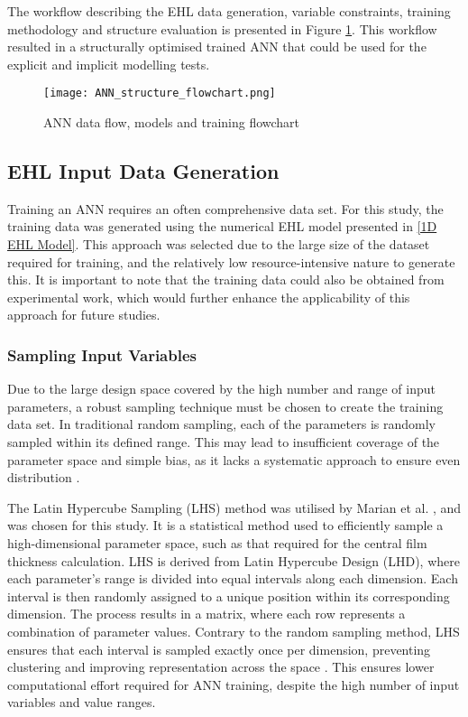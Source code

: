 The workflow describing the EHL data generation, variable constraints, training methodology and structure evaluation is presented in Figure \ref{ANN flowchart}. This workflow resulted in a structurally optimised trained ANN that could be used for the explicit and implicit modelling tests.

\begin{figure}  
	\centering
	\texttt{[image: ANN\_structure\_flowchart.png]}
	\caption{ANN data flow, models and training flowchart}
	\label{ANN flowchart}
\end{figure} 

\subsection{EHL Input Data Generation}

Training an ANN requires an often comprehensive data set. For this study, the training data was generated using the numerical EHL model presented in \ref{1D EHL Model}. This approach was selected due to the large size of the dataset required for training, and the relatively low resource-intensive nature to generate this. It is important to note that the training data could also be obtained from experimental work, which would further enhance the applicability of this approach for future studies.

\subsubsection{Sampling Input Variables}

Due to the large design space covered by the high number and range of input parameters, a robust sampling technique must be chosen to create the training data set. In traditional random sampling, each of the parameters is randomly sampled within its defined range. This may lead to insufficient coverage of the parameter space and simple bias, as it lacks a systematic approach to ensure even distribution \cite{Preece2016}.

The Latin Hypercube Sampling (LHS) method was utilised by Marian et al. \cite{Marian2022}, and was chosen for this study. It is a statistical method used to efficiently sample a high-dimensional parameter space, such as that required for the central film thickness calculation. LHS is derived from Latin Hypercube Design (LHD), where each parameter’s range is divided into equal intervals along each dimension. Each interval is then randomly assigned to a unique position within its corresponding dimension. The process results in a matrix, where each row represents a combination of parameter values. Contrary to the random sampling method, LHS ensures that each interval is sampled exactly once per dimension, preventing clustering and improving representation across the space \cite{Preece2016}. This ensures lower computational effort required for ANN training, despite the high number of input variables and value ranges.

